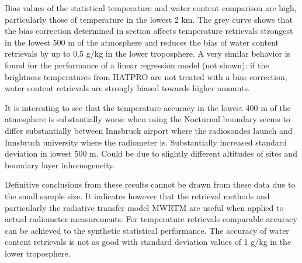         {}

    Bias values of the statistical temperature and water content comparison
    are high, particularly those of temperature in the lowest 2 km. The grey
    curve shows that the bias correction determined in section \in[ch:hatpro]
    affects temperature retrievals strongest in the lowest 500 m of the
    atmosphere and reduces the bias of water content retrievals by up to 0.5
    g/kg in the lower troposphere. A very similar behavior is found for the
    performance of a linear regression model (not shown): if the brightness
    temperatures from HATPRO are not treated with a bias correction, water
    content retrievals are strongly biased towards higher amounts.

    It is interesting to see that the temperature accuracy in the lowest 400 m
    of the atmosphere is substantially worse when using the 
    Nocturnal boundary seems to differ substantially between Innsbruck airport
    where the radiosondes launch and Innsbruch university where the radiometer
    is. Substantially increased standard deviation in lowest 500 m. Could be
    due to slightly different altitudes of sites and boundary layer
    inhomogeneity.

    Definitive conclusions from these results cannot be drawn from these data
    due to the small sample size. It indicates however that the retrieval
    methods and particularly the radiative transfer model MWRTM are useful
    when applied to actual radiometer measurements. For temperature retrievals
    comparable accuracy can be achieved to the synthetic statistical
    performance. The accuracy of water content retrievals is not as good with
    standard deviation values of 1 g/kg in the lower troposphere.

